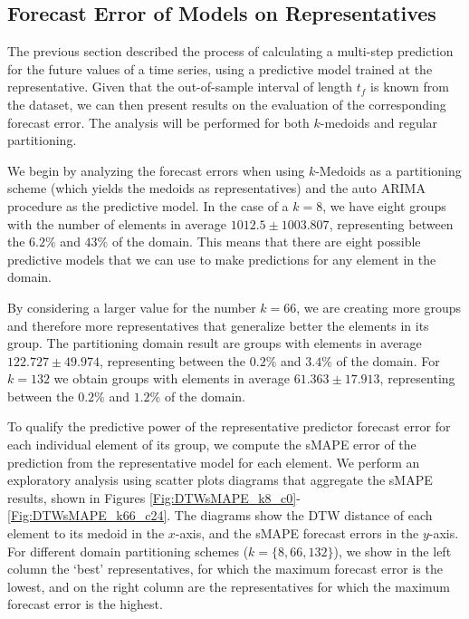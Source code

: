\subsection{Forecast Error of Models on Representatives}
\label{Sec:AnalyzeForecastErrors}

The previous section described the process of calculating a multi-step prediction for the future values of a time series, using a predictive model trained at the representative. Given that the out-of-sample interval of length $t_f$ is known from the dataset, we can then present results on the evaluation of the corresponding forecast error. The analysis will be performed for both $k$-medoids and regular partitioning.

We begin by analyzing the forecast errors when using $k$-Medoids as a partitioning scheme (which yields the medoids as representatives) and the auto ARIMA procedure as the predictive model. In the case of a $k=8$, we have eight groups with the number of elements in average $1012.5 \pm 1003.807$, representing between the $6.2\%$ and $43\%$ of the domain. This means that there are eight possible predictive models that we can use to make predictions for any element in the domain.

By considering a larger value for the number $k=66$, we are creating more groups and therefore more representatives that generalize better the elements in its group. The partitioning domain result are groups with elements in average $122.727 \pm 49.974$, representing between the $0.2\%$ and $3.4\%$ of the domain. For $k=132$ we obtain groups with elements in average $61.363 \pm 17.913$, representing between the $0.2\%$ and $1.2\%$ of the domain.

To qualify the predictive power of the representative predictor forecast error for each individual element of its group, we compute the sMAPE error of the prediction from the representative model for each element.%
We perform an exploratory analysis using scatter plots diagrams that aggregate the sMAPE results, shown in Figures \ref{Fig:DTWsMAPE_k8_c0}-\ref{Fig:DTWsMAPE_k66_c24}. %
The diagrams show the DTW distance of each element to its medoid in the $x$-axis, and the sMAPE forecast errors in the $y$-axis. For different domain partitioning schemes ($k=\{8, 66, 132\}$), we show in the left column the `best' representatives, for which the maximum forecast error is the lowest, and on the right column are the representatives for which the maximum forecast error is the highest.

